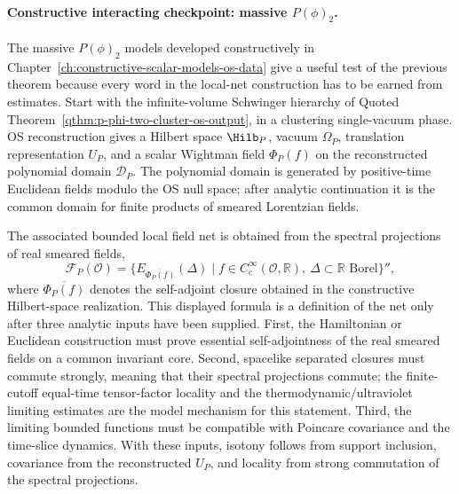 \paragraph{Constructive interacting checkpoint: massive \(P(\phi)_2\).}
The massive \(P(\phi)_2\) models developed constructively in
Chapter~\ref{ch:constructive-scalar-models-os-data} give a useful test of the
previous theorem because every word in the local-net construction has to be
earned from estimates.  Start with the infinite-volume Schwinger hierarchy of
Quoted Theorem~\ref{qthm:p-phi-two-cluster-os-output}, in a clustering
single-vacuum phase.  OS reconstruction gives a Hilbert space
\(\Hilb_P\), vacuum \(\Omega_P\), translation representation \(U_P\), and a
scalar Wightman field \(\Phi_P(f)\) on the reconstructed polynomial domain
\(\mathcal D_P\).  The polynomial domain is generated by positive-time
Euclidean fields modulo the OS null space; after analytic continuation it is
the common domain for finite products of smeared Lorentzian fields.

The associated bounded local field net is obtained from the spectral
projections of real smeared fields,
\begin{equation}
  \mathcal F_P(\mathcal O)
  =
  \{E_{\overline{\Phi_P(f)}}(\Delta)\mid
    f\in C_c^\infty(\mathcal O,\mathbb R),\
    \Delta\subset\mathbb R\text{ Borel}\}'' ,
  \label{eq:p-phi-two-constructive-local-field-net}
\end{equation}
where \(\overline{\Phi_P(f)}\) denotes the self-adjoint closure obtained in
the constructive Hilbert-space realization.  This displayed formula is a
definition of the net only after three analytic inputs have been supplied.
First, the Hamiltonian or Euclidean construction must prove essential
self-adjointness of the real smeared fields on a common invariant core.
Second, spacelike separated closures must commute strongly, meaning that their
spectral projections commute; the finite-cutoff equal-time tensor-factor
locality and the thermodynamic/ultraviolet limiting estimates are the model
mechanism for this statement.  Third, the limiting bounded functions must be
compatible with Poincare covariance and the time-slice dynamics.  With these
inputs, isotony follows from support inclusion, covariance from the
reconstructed \(U_P\), and locality from strong commutation of the spectral
projections.

